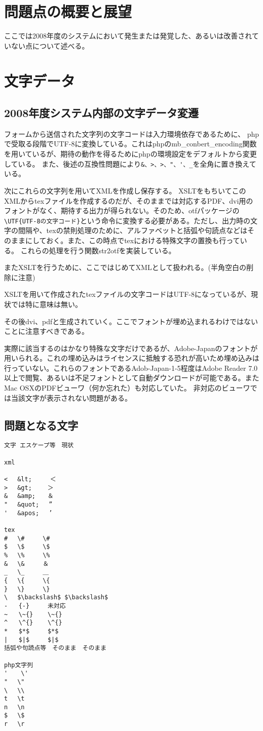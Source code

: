 \documentclass[titlepage]{jsarticle}
\begin{document}
\section{問題点の概要と展望}
ここでは2008年度のシステムにおいて発生または発覚した、あるいは改善されていない点について述べる。
\section{文字データ}
\subsection{2008年度システム内部の文字データ変遷}
フォームから送信された文字列の文字コードは入力環境依存であるために、
phpで受取る段階でUTF-8に変換している。これはphpのmb\_conbert\_encoding関数を用いているが、期待の動作を得るためにphpの環境設定をデフォルトから変更している。
また、後述の互換性問題により\verb|&、>、>、"、'、_|を全角に置き換えている。

次にこれらの文字列を用いてXMLを作成し保存する。
XSLTをもちいてこのXMLからtexファイルを作成するのだが、そのままでは対応するPDF、dvi用のフォントがなく、期待する出力が得られない。そのため、otfパッケージの\verb|\UTF{UTF-8の文字コード}|という命令に変換する必要がある。ただし、出力時の文字の間隔や、texの禁則処理のために、アルファベットと括弧や句読点などはそのままにしておく。また、この時点でtexにおける特殊文字の置換も行っている。
これらの処理を行う関数str2otfを実装している。


またXSLTを行うために、ここではじめてXMLとして扱われる。(半角空白の削除に注意)

XSLTを用いて作成されたtexファイルの文字コードはUTF-8になっているが、現状では特に意味は無い。

その後dvi、pdfと生成されていく。ここでフォントが埋め込まれるわけではないことに注意すべきである。

実際に該当するのはかなり特殊な文字だけであるが、Adobe-Japanのフォントが用いられる。これの埋め込みはライセンスに抵触する恐れが高いため埋め込みは行っていない。これらのフォントであるAdob-Japan-1-5程度はAdobe Reader 7.0以上で閲覧、あるいは不足フォントとして自動ダウンロードが可能である。またMac OSXのPDFビューワ（何か忘れた）も対応していた。
非対応のビューワでは当該文字が表示されない問題がある。
\subsection{問題となる文字}
\begin{verbatim}
文字 エスケープ等　現状

xml

< 　&lt;     ＜
> 　&gt; 　　＞
& 　&amp;　　＆
" 　&quot; 　”
' 　&apos; 　’

tex
# 　\#　　　\#
$ 　\$　　　\$
% 　\%　　　\%
& 　\&　　　＆
_ 　\_　　　＿
{ 　\{　　　\{
} 　\}　　　\}
\ 　$\backslash$ $\backslash$
-   {-}     未対応
~   \~{}    \~{}
^   \^{}    \^{}
*   $*$     $*$
|   $|$     $|$
括弧や句読点等　そのまま　そのまま

php文字列
'　  \'
"　 \"
\ 　\\
t 　\t
n　 \n
$　 \$
r　 \r
\end{verbatim}
\end{document}
